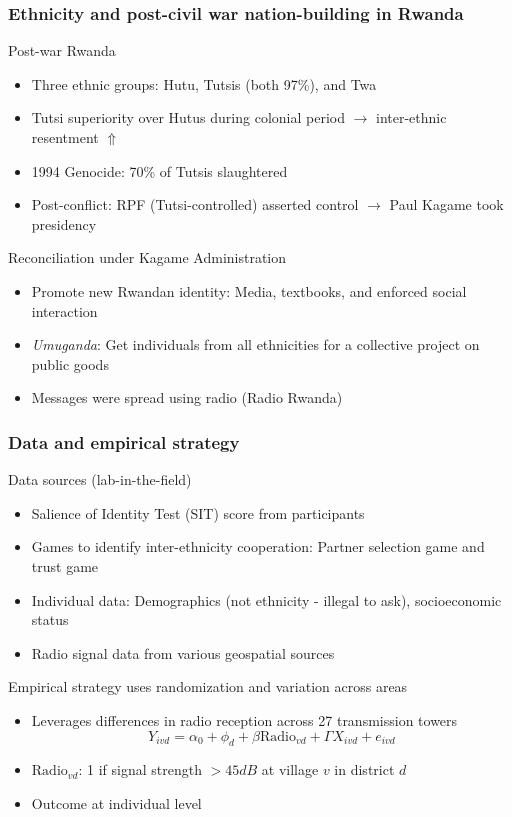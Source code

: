\documentclass[aspectratio=169]{beamer}
\begin{document}
\begin{frame}
\frametitle{Ethnicity and post-civil war nation-building in Rwanda} 
Post-war Rwanda
\begin{itemize}\setlength\itemsep{3pt}
\item  Three ethnic groups: Hutu, Tutsis (both 97\%), and Twa 
\item Tutsi superiority over Hutus during colonial period $\to$ inter-ethnic resentment $\Uparrow$
\item 1994 Genocide: 70\% of Tutsis slaughtered 
\item Post-conflict: RPF (Tutsi-controlled) asserted control $\to$ Paul Kagame took presidency
\end{itemize}\medskip
Reconciliation under Kagame Administration
\begin{itemize}\setlength\itemsep{3pt}
\item Promote new Rwandan identity: Media, textbooks, and enforced social interaction
\item \textit{Umuganda}: Get individuals from all ethnicities for a collective project on public goods
\item Messages were spread using radio (Radio Rwanda)
\end{itemize}\medskip
\end{frame}

\begin{frame}
\frametitle{Data and empirical strategy} 
Data sources (lab-in-the-field)
\begin{itemize}\setlength\itemsep{3pt}
\item Salience of Identity Test (SIT) score from participants
\item Games to identify inter-ethnicity cooperation: Partner selection game and trust game
\item Individual data: Demographics (not ethnicity - illegal to ask), socioeconomic status
\item Radio signal data from various geospatial sources
\end{itemize}\medskip
Empirical strategy uses randomization and variation across areas
\begin{itemize}\setlength\itemsep{3pt}
\item Leverages differences in radio reception across 27 transmission towers
\[
Y_{ivd}=\alpha_0 + \phi_d + \beta\text{Radio}_{vd}+\Gamma X_{ivd}+e_{ivd}
\]
\item $\text{Radio}_{vd}$: 1 if signal strength $> 45 dB$ at village $v$ in district $d$
\item Outcome at individual level
\end{itemize}\medskip
\end{frame}
\end{document}
